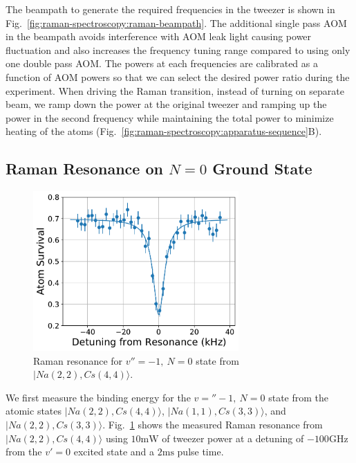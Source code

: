 The beampath to generate the required frequencies in the tweezer is shown in
Fig.~\ref{fig:raman-spectroscopy:raman-beampath}.
The additional single pass AOM in the beampath avoids interference
with AOM leak light causing power fluctuation and
also increases the frequency tuning range compared to using only one double pass AOM.
The powers at each frequencies are calibrated as a function of AOM powers
so that we can select the desired power ratio during the experiment.
When driving the Raman transition, instead of turning on separate beam,
we ramp down the power at the original tweezer and ramping up the power
in the second frequency while maintaining the total power to minimize heating of the atoms
(Fig.~\ref{fig:raman-spectroscopy:apparatus-sequence}B).

\subsection{Raman Resonance on $N=0$ Ground State}

\begin{figure}
  \centering
  \includegraphics[width=0.7\textwidth]{figures/raman_spectroscopy_resonance.pdf}
  \caption[Raman resonance for $v''=-1,\ N=0$ state]{
    Raman resonance for $v''=-1,\ N=0$ state from $|Na(2, 2),Cs(4, 4)\rangle$.
    \label{fig:raman-spectroscopy:resonance}}
\end{figure}

We first measure the binding energy for the $v=''-1,\ N=0$ state
from the atomic states $|Na(2, 2),Cs(4, 4)\rangle$, $|Na(1, 1),Cs(3, 3)\rangle$,
and $|Na(2, 2),Cs(3, 3)\rangle$.
Fig.~\ref{fig:raman-spectroscopy:resonance} shows the measured Raman resonance from
$|Na(2, 2),Cs(4, 4)\rangle$ using $10 \mathrm{mW}$ of tweezer power at a detuning of
$-100 \mathrm{GHz}$ from the $v'=0$ excited state and a $2 \mathrm{ms}$ pulse time.

